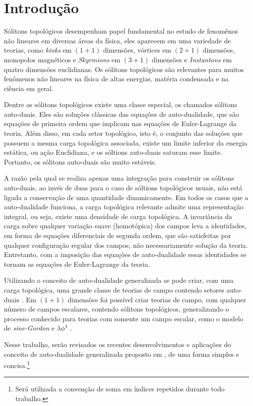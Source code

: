 \chapter[Introdução]{Introdução}
\label{Introdução}

Sólitons topológicos desempenham papel fundamental no estudo de fenomênos não lineares em diversas áreas da física, eles aparecem em uma variedade de teorias, como \textit{kinks} em $(1+1)$ dimensões, vórtices em $(2+1)$ dimensões, monopolos magnéticos e \textit{Skyrmions} em $(3+1)$ dimensões e \textit{Instantons} em quatro dimensões euclidianas. Os sólitons topológicos são relevantes para muitos fenômenos não lineares na física de altas energias, matéria condensada e na ciência em geral.

Dentre os sólitons topológicos existe uma classe especial, os chamados sólitons auto-duais. Eles são soluções clássicas das equações de auto-dualidade, que são equações de primeira ordem que implicam nas equações de Euler-Lagrange da teoria. Além disso, em cada setor topológico, isto é, o conjunto das soluções que possuem a mesma carga topológica associada, existe um limite inferior da energia estática, ou ação Euclidiana, e os sóltions auto-duais saturam esse limite. Portanto, os sólitons auto-duais são muito estáveis.

A razão pela qual se realiza apenas uma integração para construir os sólitons auto-duais, ao invés de duas para o caso de sóltions topológicos usuais, não está ligada a conservação de uma quantidade dinamicamente. Em todos os casos que a auto-dualidade funciona, a carga topológica relevante admite uma representação integral, ou seja, existe uma densidade de carga topológica. A invariância da carga sobre qualquer variação suave (homotópica) dos campos leva a identidades, em forma de equações diferenciais de segunda ordem, que são satisfeitas por qualquer configuração regular dos campos, não necessariamente solução da teoria. Entretanto, com a imposição das equações de auto-dualidade essas identidades se tornam as equações de Euler-Lagrange da teoria.

Utilizando o conceito de auto-dualidade generalizada se pode criar, com uma carga topológica, uma grande classe de teorias de campo contendo setores auto-duais \cite{lafBPS}. Em $(1+1)$ dimensões foi possível criar teorias de campo, com qualquer número de campos escalares, contendo sólitons topológicos, generalizando o processo conhecido para teorias com somente um campo escalar, como o modelo de \textit{sine-Gordon} e $\lambda \phi^4$ \cite{laf(1+1)}.

Nesse trabalho, serão revisados os recentes desenvolvimentos e aplicações do conceito de auto-dualidade generalizada proposto em \cite{lafBPS}, de uma forma simples e concisa.\footnote{Será utilizada a convenção de soma em índices repetidos durante todo trabalho.}